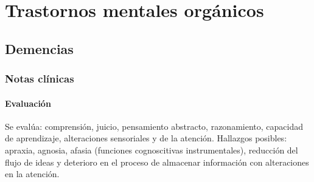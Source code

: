 \documentclass{scrbook}
\begin{document}
\part{Trastornos mentales orgánicos}
\chapter{Demencias}
\section*{Notas clínicas}
\subsection*{Evaluación}
Se evalúa: comprensión, juicio, pensamiento abstracto, razonamiento, capacidad de aprendizaje, alteraciones sensoriales y de la atención. Hallazgos posibles: apraxia, agnosia, afasia (funciones cognoscitivas instrumentales), reducción del flujo de ideas y deterioro en el proceso de almacenar información con alteraciones en la atención.
\end{document}
